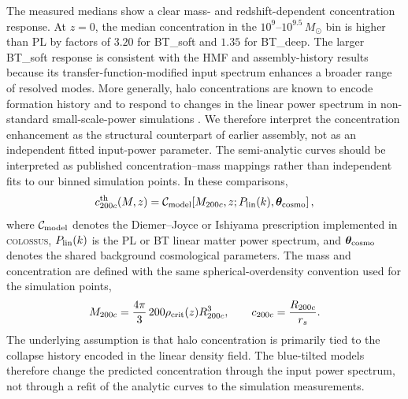 \documentclass[
 reprint,
 superscriptaddress,
 nofootinbib,
 nobibnotes,
 amsmath,
 amssymb,
 aps,
 prd,
 floatfix,
 longbibliography
]{revtex4-2}
\begin{document}
The measured medians show a clear mass- and redshift-dependent concentration response. At \(z=0\), the median concentration in the \(10^9\)--\(10^{9.5}\,M_\odot\) bin is higher than PL by factors of \(3.20\) for BT\_soft and \(1.35\) for BT\_deep. The larger BT\_soft response is consistent with the HMF and assembly-history results because its transfer-function-modified input spectrum enhances a broader range of resolved modes. More generally, halo concentrations are known to encode formation history and to respond to changes in the linear power spectrum in non-standard small-scale-power simulations \citep{Ludlow2016WDMConcentration,Brown2020HaloPPS}. We therefore interpret the concentration enhancement as the structural counterpart of earlier assembly, not as an independent fitted input-power parameter.
The semi-analytic curves should be interpreted as published concentration--mass mappings rather than independent fits to our binned simulation points. In these comparisons,
\begin{equation}
\label{eq:colossus_concentration}
c_{200c}^{\rm th}(M,z)=\mathcal{C}_{\rm model}\!\left[M_{200c},z;P_{\rm lin}(k),\boldsymbol{\theta}_{\rm cosmo}\right],
\end{equation}
where \(\mathcal{C}_{\rm model}\) denotes the Diemer--Joyce or Ishiyama prescription implemented in \textsc{colossus}, \(P_{\rm lin}(k)\) is the PL or BT linear matter power spectrum, and \(\boldsymbol{\theta}_{\rm cosmo}\) denotes the shared background cosmological parameters. The mass and concentration are defined with the same spherical-overdensity convention used for the simulation points,
\begin{equation}
\label{eq:m200c_c200c_definitions}
\begin{gathered}
M_{200c}=\frac{4\pi}{3}\,200\rho_{\rm crit}(z)R_{200c}^{3},
\qquad
c_{200c}=\frac{R_{200c}}{r_s}.
\end{gathered}
\end{equation}
The underlying assumption is that halo concentration is primarily tied to the collapse history encoded in the linear density field. The blue-tilted models therefore change the predicted concentration through the input power spectrum, not through a refit of the analytic curves to the simulation measurements.
\end{document}
